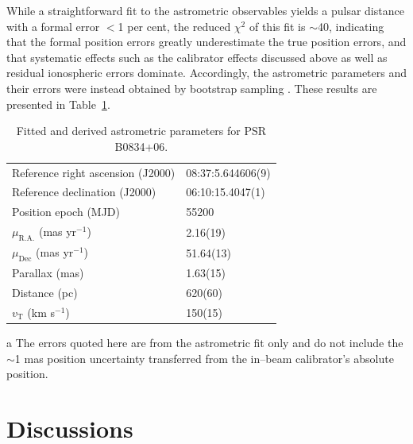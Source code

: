 \documentclass[useAMS,usenatbib]{mn2e}
\begin{document}
While a straightforward fit to the astrometric observables yields a pulsar distance with a formal error $<$1 per cent, the reduced $\chi^2$ of this fit is $\sim$40, indicating that the formal position errors greatly underestimate the true position errors, and that systematic effects such as the calibrator effects discussed above as well as residual ionospheric errors dominate.  Accordingly, the astrometric parameters and their errors were instead obtained by bootstrap sampling \citep{efron91a}.  These results are presented in Table~\ref{tab:vlbi}.

\begin{table}
\caption{Fitted and derived astrometric parameters for PSR B0834+06.}
\begin{threeparttable}
\begin{tabular}{ll}
\hline
Reference right ascension (J2000)\tnote{a}
							&  08:37:5.644606(9)\\
Reference declination (J2000)\tnote{a}
							&  06:10:15.4047(1)\\
Position epoch (MJD)			& 55200 \\
$\mu_{\mathrm{R.A.}}$ (mas yr$^{-1}$)	& 2.16(19) \\
$\mu_{\mathrm{Dec}}$	(mas yr$^{-1}$) & 51.64(13)  \\
Parallax (mas)	 				& 1.63(15) \\
Distance (pc)					& 620(60) \\
$v_{\mathrm T}$ (km s$^{-1}$)	& 150(15)\\
\hline
\end{tabular}
\begin{tablenotes}
\item[a]{The errors quoted here are from the astrometric fit only and do not include the $\sim$1 mas position uncertainty transferred from the in--beam calibrator's absolute position.}
\end{tablenotes}
\end{threeparttable}
\label{tab:vlbi}
\end{table}




\section{Discussions}
\end{document}
